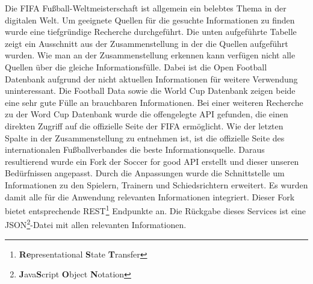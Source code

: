 \documentclass[runningheads,a4paper]{llncs}
\begin{document}
Die FIFA Fußball-Weltmeisterschaft ist allgemein ein belebtes Thema in der digitalen Welt. Um geeignete Quellen für die gesuchte Informationen zu finden wurde eine tiefgründige Recherche durchgeführt. Die unten aufgeführte Tabelle zeigt ein Ausschnitt aus der Zusammenstellung in der die Quellen aufgeführt wurden. Wie man an der Zusammenstellung erkennen kann verfügen nicht alle Quellen über die gleiche Informationsfülle. Dabei ist die Open Football Datenbank aufgrund der nicht aktuellen Informationen für weitere Verwendung uninteressant. Die Football Data sowie die World Cup Datenbank zeigen beide eine sehr gute Fülle an brauchbaren Informationen. Bei einer weiteren Recherche zu der Word Cup Datenbank wurde die offengelegte API gefunden, die einen direkten Zugriff auf die offizielle Seite der FIFA ermöglicht. Wie der letzten Spalte in der Zusammenstellung zu entnehmen ist, ist die offizielle Seite des internationalen Fußballverbandes die beste Informationsquelle. 
Daraus resultierend wurde ein Fork der Soccer for good API erstellt und dieser unseren Bedürfnissen angepasst. Durch die Anpassungen wurde die Schnittstelle um Informationen zu den Spielern, Trainern und Schiedsrichtern erweitert. Es wurden damit alle für die Anwendung relevanten Informationen  integriert. Dieser Fork bietet entsprechende REST\footnote{\textbf{Re}presentational \textbf{S}tate \textbf{T}ransfer} Endpunkte an. Die Rückgabe dieses Services ist eine JSON\footnote{\textbf{J}ava\textbf{S}cript \textbf{O}bject \textbf{N}otation}-Datei mit allen relevanten Informationen. \\
\end{document}
